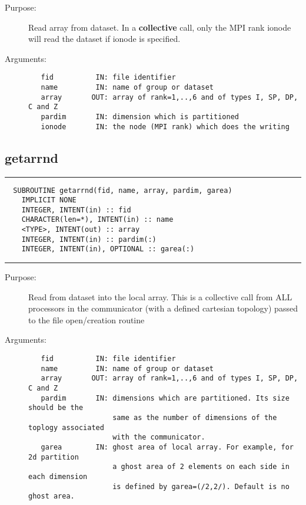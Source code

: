 \documentclass[a4paper]{article}
\begin{document}
\begin{description}
\item[Purpose:] \mbox{}

Read array from dataset.  In a {\bfseries collective} call, only the MPI rank
{\ttfamily ionode} will read the dataset if {\ttfamily ionode} is specified.

\item[Arguments:] \mbox{}

\begin{verbatim}
   fid          IN: file identifier
   name         IN: name of group or dataset
   array       OUT: array of rank=1,..,6 and of types I, SP, DP, C and Z
   pardim       IN: dimension which is partitioned
   ionode       IN: the node (MPI rank) which does the writing

\end{verbatim}


\end{description}





\subsection{getarrnd}

\par
\addvspace{\medskipamount}
\nopagebreak\hrule
\begin{verbatim}
  SUBROUTINE getarrnd(fid, name, array, pardim, garea)
    IMPLICIT NONE
    INTEGER, INTENT(in) :: fid
    CHARACTER(len=*), INTENT(in) :: name
    <TYPE>, INTENT(out) :: array
    INTEGER, INTENT(in) :: pardim(:)
    INTEGER, INTENT(in), OPTIONAL :: garea(:)
\end{verbatim}
\nopagebreak\hrule
\addvspace{\medskipamount}

\begin{description}
\item[Purpose:] \mbox{}

Read from dataset into the local array.  This is a collective call from ALL
processors in the communicator (with a defined cartesian
topology) passed to the file open/creation routine

\item[Arguments:] \mbox{}

\begin{verbatim}
   fid          IN: file identifier
   name         IN: name of group or dataset
   array       OUT: array of rank=1,..,6 and of types I, SP, DP, C and Z
   pardim       IN: dimensions which are partitioned. Its size should be the
                    same as the number of dimensions of the toplogy associated
                    with the communicator.
   garea        IN: ghost area of local array. For example, for 2d partition
                    a ghost area of 2 elements on each side in each dimension
                    is defined by garea=(/2,2/). Default is no ghost area.

\end{verbatim}


\end{description}
\end{document}
